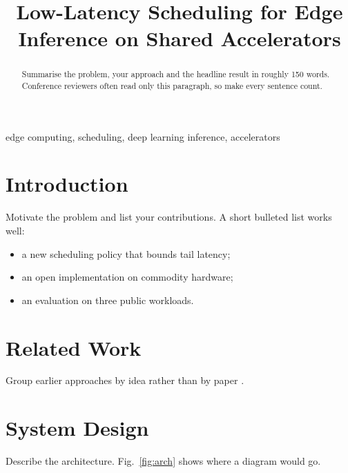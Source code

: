 \documentclass[conference]{IEEEtran}
\begin{document}
\title{Low-Latency Scheduling for Edge Inference on Shared Accelerators}

\author{
\and
{}
}

\maketitle

\begin{abstract}
Summarise the problem, your approach and the headline result in roughly 150 words.
Conference reviewers often read only this paragraph, so make every sentence count.
\end{abstract}

\begin{IEEEkeywords}
edge computing, scheduling, deep learning inference, accelerators
\end{IEEEkeywords}

\section{Introduction}
Motivate the problem and list your contributions. A short bulleted list works well:
\begin{itemize}
  \item a new scheduling policy that bounds tail latency;
  \item an open implementation on commodity hardware;
  \item an evaluation on three public workloads.
\end{itemize}

\section{Related Work}
Group earlier approaches by idea rather than by paper \cite{smith2020,chen2022}.

\section{System Design}
Describe the architecture. Fig.~\ref{fig:arch} shows where a diagram would go.
\end{document}
